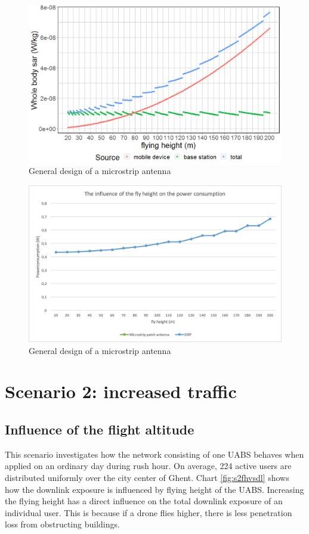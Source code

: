 \begin{figure}[th!]
  \includegraphics[width=\textwidth]{../results/s1/fhvssar2.png}
  \caption{General design of a microstrip antenna}
  \label{fig:s1_fhsar}
\end{figure}

\begin{figure}[bh!]
  \includegraphics[width=\textwidth]{../results/s1/flyheight-pc.png}
  \caption{General design of a microstrip antenna}
  \label{fig:pcsar}
\end{figure}



\section{Scenario 2: increased traffic}

\subsection{Influence of the flight altitude}
This scenario investigates how the network consisting of one \gls{UABS} behaves when applied on an ordinary day during rush hour. 
On average, 224 active users are distributed uniformly over the city center of Ghent. 
Chart \ref{fig:s2fhvsdl} shows how the downlink exposure is influenced by flying height of the \gls{UABS}. 
Increasing the flying height has a direct influence on the total downlink exposure of an individual user. 
This is because if a drone flies higher, there is less penetration loss from obstructing buildings.

